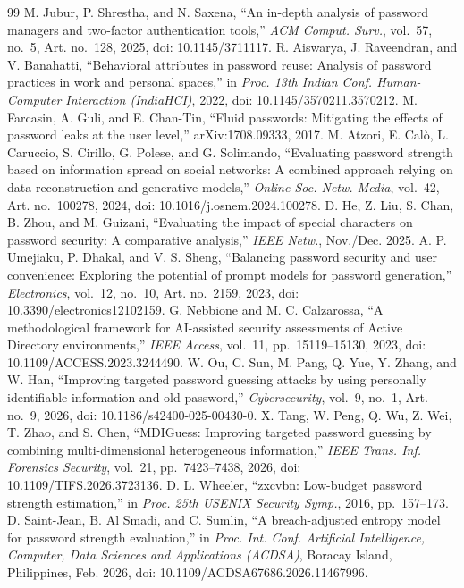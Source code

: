 \documentclass[preprint,12pt]{elsarticle}
\begin{document}
\begin{thebibliography}{99}
 M. Jubur, P. Shrestha, and N. Saxena, ``An in-depth analysis of password managers and two-factor authentication tools,'' \emph{ACM Comput. Surv.}, vol.~57, no.~5, Art. no.~128, 2025, doi: 10.1145/3711117.
 R. Aiswarya, J. Raveendran, and V. Banahatti, ``Behavioral attributes in password reuse: Analysis of password practices in work and personal spaces,'' in \emph{Proc. 13th Indian Conf. Human-Computer Interaction (IndiaHCI)}, 2022, doi: 10.1145/3570211.3570212.
 M. Farcasin, A. Guli, and E. Chan-Tin, ``Fluid passwords: Mitigating the effects of password leaks at the user level,'' arXiv:1708.09333, 2017.
 M. Atzori, E. Cal\`o, L. Caruccio, S. Cirillo, G. Polese, and G. Solimando, ``Evaluating password strength based on information spread on social networks: A combined approach relying on data reconstruction and generative models,'' \emph{Online Soc. Netw. Media}, vol.~42, Art. no.~100278, 2024, doi: 10.1016/j.osnem.2024.100278.
 D. He, Z. Liu, S. Chan, B. Zhou, and M. Guizani, ``Evaluating the impact of special characters on password security: A comparative analysis,'' \emph{IEEE Netw.}, Nov./Dec. 2025.
 A. P. Umejiaku, P. Dhakal, and V. S. Sheng, ``Balancing password security and user convenience: Exploring the potential of prompt models for password generation,'' \emph{Electronics}, vol.~12, no.~10, Art. no.~2159, 2023, doi: 10.3390/electronics12102159.
 G. Nebbione and M. C. Calzarossa, ``A methodological framework for AI-assisted security assessments of Active Directory environments,'' \emph{IEEE Access}, vol.~11, pp.~15119--15130, 2023, doi: 10.1109/ACCESS.2023.3244490.
 W. Ou, C. Sun, M. Pang, Q. Yue, Y. Zhang, and W. Han, ``Improving targeted password guessing attacks by using personally identifiable information and old password,'' \emph{Cybersecurity}, vol.~9, no.~1, Art. no.~9, 2026, doi: 10.1186/s42400-025-00430-0.
 X. Tang, W. Peng, Q. Wu, Z. Wei, T. Zhao, and S. Chen, ``MDIGuess: Improving targeted password guessing by combining multi-dimensional heterogeneous information,'' \emph{IEEE Trans. Inf. Forensics Security}, vol.~21, pp.~7423--7438, 2026, doi: 10.1109/TIFS.2026.3723136.
 D. L. Wheeler, ``zxcvbn: Low-budget password strength estimation,'' in \emph{Proc. 25th USENIX Security Symp.}, 2016, pp.~157--173.
 D. Saint-Jean, B. Al Smadi, and C. Sumlin, ``A breach-adjusted entropy model for password strength evaluation,'' in \emph{Proc. Int. Conf. Artificial Intelligence, Computer, Data Sciences and Applications (ACDSA)}, Boracay Island, Philippines, Feb. 2026, doi: 10.1109/ACDSA67686.2026.11467996.

\end{thebibliography}
\end{document}
